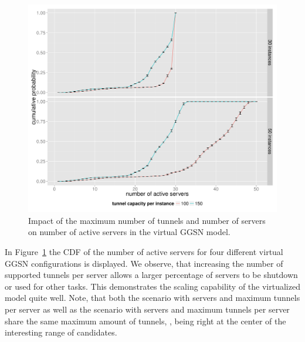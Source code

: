 \begin{figure}[htb]
  \centering
  \includegraphics[width=1.0\textwidth]{images/R-virtualized-instanceuse.pdf}
  \caption{Impact of the maximum number of tunnels and number of servers on number of active servers in the virtual \gls{GGSN} model.}
 \label{c4:fig:virtualized_instanceuse}
\end{figure}

In Figure~\ref{c4:fig:virtualized_instanceuse} the \gls{CDF} of the number of active servers for four different virtual \gls{GGSN} configurations is displayed. We observe, that increasing the number of supported tunnels per server allows a larger percentage of servers to be shutdown or used for other tasks. This demonstrates the scaling capability of the virtualized model quite well. Note, that both the scenario with  servers and  maximum tunnels per server as well as the scenario with  servers and  maximum tunnels per server share the same maximum amount of tunnels, , being right at the center of the interesting range of candidates.

